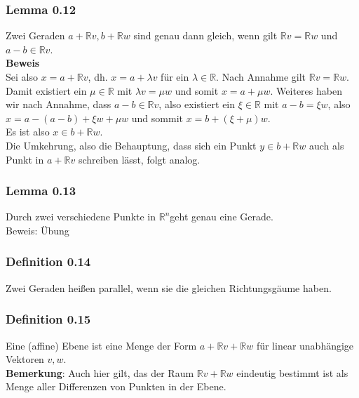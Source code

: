 \documentclass{scrartcl}
\newcommand{\lb}{\lambda}
\newcommand{\R}{\mathbb{R}}
\newcommand{\mRn}{\(\mathbb{R}^n\)}
\begin{document}
\subsubsection{Lemma 0.12}
Zwei Geraden \(a + \R v, b + \R w\) sind genau dann gleich, wenn gilt \(\R v = \R w\) und \(a - b \in \R v\).\\
\textbf{Beweis}\\
Sei also  \(x = a + \R v\), dh. \(x = a + \lb v\) f\"ur ein \(\lb \in \R\). Nach Annahme gilt \(\R v = \R w\). Damit existiert ein \(\mu \in \R\) mit \(\lb v = \mu w\) und somit \(x = a + \mu w\). Weiteres haben wir nach Annahme, dass \(a-b \in \R v\), also existiert ein \(\xi \in \R\) mit \(a - b = \xi w\), also \(x = a - (a - b) + \xi w + \mu w\) und sommit \(x = b + (\xi + \mu) w\).\\
Es ist also \(x \in b + \R w\).\\
Die Umkehrung, also die Behauptung, dass sich ein Punkt \(y \in b + \R w\) auch als Punkt in \(a + \R v\) schreiben l\"asst, folgt analog.\\

\subsubsection{Lemma 0.13}
Durch zwei verschiedene Punkte in \mRn geht genau eine Gerade.\\
Beweis: \"Ubung

\subsubsection{Definition 0.14}
Zwei Geraden hei\ss{}en parallel, wenn sie die gleichen Richtungsg\"aume haben.

\subsubsection{Definition 0.15}
Eine (affine) Ebene ist eine Menge der Form \(a + \R v + \R w\) f\"ur linear unabh\"angige Vektoren \(v, w\).\\
\textbf{Bemerkung}: Auch hier gilt, das der Raum \(\R v + \R w\) eindeutig bestimmt ist als Menge aller Differenzen von Punkten in der Ebene.
\end{document}
